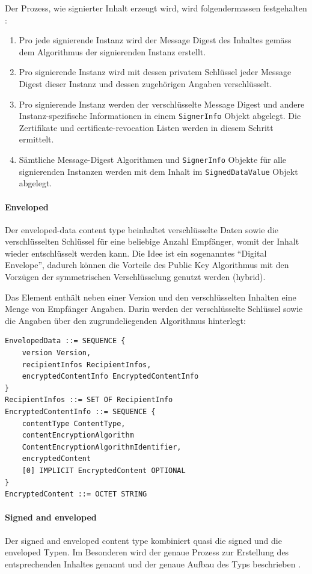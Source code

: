 \documentclass[10pt,a4paper]{article}
\begin{document}
Der Prozess, wie signierter Inhalt erzeugt wird, wird folgendermassen festgehalten
\cite[S.10]{pkcs7}:
\begin{enumerate}
    \item Pro jede signierende Instanz wird der Message Digest des Inhaltes gemäss dem
        Algorithmus der signierenden Instanz erstellt.
    \item Pro signierende Instanz wird mit dessen privatem Schlüssel jeder Message Digest
        dieser Instanz und dessen zugehörigen Angaben verschlüsselt.
    \item Pro signierende Instanz werden der verschlüsselte Message Digest und andere
        Instanz-spezifische Informationen in einem \texttt{SignerInfo} Objekt abgelegt.
        Die Zertifikate und certificate-revocation Listen werden in diesem Schritt
        ermittelt.
    \item Sämtliche Message-Digest Algorithmen und \texttt{SignerInfo} Objekte für alle
        signierenden Instanzen werden mit dem Inhalt im \texttt{SignedDataValue} Objekt
        abgelegt.
\end{enumerate}

\paragraph{Enveloped}
Der enveloped-data content type beinhaltet verschlüsselte Daten sowie die verschlüsselten
Schlüssel für eine beliebige Anzahl Empfänger, womit der Inhalt wieder entschlüsselt
werden kann. Die Idee ist ein sogenanntes "`Digital Envelope"', dadurch können die
Vorteile des Public Key Algorithmus mit den Vorzügen der symmetrischen Verschlüsselung
genutzt werden (hybrid).

Das Element enthält neben einer Version und den verschlüsselten Inhalten eine Menge von
Empfänger Angaben. Darin werden der verschlüsselte Schlüssel sowie die Angaben über den
zugrundeliegenden Algorithmus hinterlegt:
\begin{verbatim}
EnvelopedData ::= SEQUENCE {
    version Version,
    recipientInfos RecipientInfos,
    encryptedContentInfo EncryptedContentInfo
}
RecipientInfos ::= SET OF RecipientInfo
EncryptedContentInfo ::= SEQUENCE {
    contentType ContentType,
    contentEncryptionAlgorithm
    ContentEncryptionAlgorithmIdentifier,
    encryptedContent
    [0] IMPLICIT EncryptedContent OPTIONAL
}
EncryptedContent ::= OCTET STRING
\end{verbatim}
\label{syntax:enveloped}

\paragraph{Signed and enveloped}
Der signed and enveloped content type kombiniert quasi die signed und die enveloped Typen.
Im Besonderen wird der genaue Prozess zur Erstellung des entsprechenden Inhaltes genannt
\cite[S.22]{pkcs7} und der genaue Aufbau des Typs beschrieben \cite[S.23]{pkcs7}.
\end{document}
